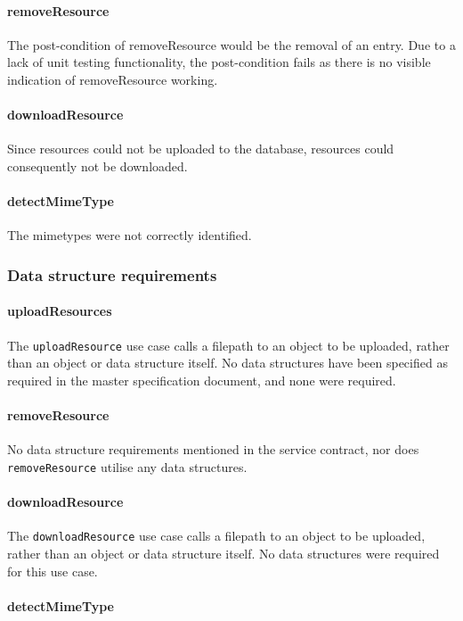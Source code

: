 \documentclass[a4paper]{article}
\begin{document}
\paragraph{removeResource}
The post-condition of removeResource would be the removal of an entry. Due to a lack of unit testing functionality, the post-condition fails as there is no visible indication of removeResource working.

\paragraph{downloadResource}
Since resources could not be uploaded to the database, resources could consequently not be downloaded.

\paragraph{detectMimeType}
The mimetypes were not correctly identified.

\subsubsection {Data structure requirements}

\paragraph{uploadResources}
The \texttt{uploadResource} use case calls a filepath to an object to be uploaded, rather than an object or data structure itself. No data structures have been specified as required in the master specification document, and none were required.

\paragraph{removeResource}
No data structure requirements mentioned in the service contract, nor does \texttt{removeResource} utilise any data structures.

\paragraph{downloadResource}
The \texttt{downloadResource} use case calls a filepath to an object to be uploaded, rather than an object or data structure itself. No data structures were required for this use case.

\paragraph{detectMimeType}
\end{document}
